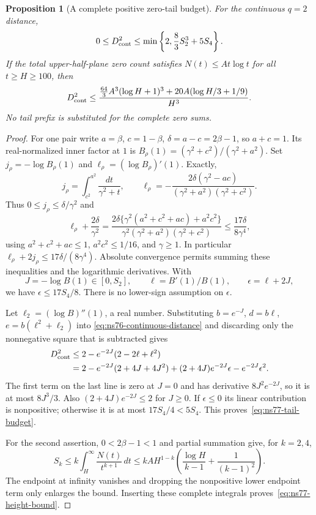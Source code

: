 \documentclass[11pt]{article}
\newtheorem{proposition}[theorem]{Proposition}
\theoremstyle{remark}
\begin{document}
\begin{proposition}[A complete positive zero-tail budget]
\label{prop:ns77-tail-budget}
For the continuous $q=2$ distance,
\begin{equation}
 0\leq D_{\rm cont}^2\leq
       \min\left\{2,\frac83S_2^3+5S_4\right\}.
 \label{eq:ns77-tail-budget}
\end{equation}
If the total upper-half-plane zero count satisfies
$N(t)\leq A t\log t$ for all $t\geq H\geq100$, then
\begin{equation}
 D_{\rm cont}^2\leq
 \frac{\frac{64}{3}A^3(\log H+1)^3
                  +20A(\log H/3+1/9)}{H^3}.
 \label{eq:ns77-height-bound}
\end{equation}
No tail prefix is substituted for the complete zero sums.
\end{proposition}
\begin{proof}
For one pair write $a=\beta$, $c=1-\beta$, $\delta=a-c=2\beta-1$,
so $a+c=1$. Its real-normalized inner factor at $1$ is
$B_\rho(1)=(\gamma^2+c^2)/(\gamma^2+a^2)$.
Set $j_\rho=-\log B_\rho(1)$ and
$\ell_\rho=(\log B_\rho)'(1)$. Exactly,
\[
 j_\rho=\int_{c^2}^{a^2}\frac{dt}{\gamma^2+t},\qquad
 \ell_\rho=-\frac{2\delta(\gamma^2-ac)}
                        {(\gamma^2+a^2)(\gamma^2+c^2)}.
\]
Thus $0\leq j_\rho\leq\delta/\gamma^2$ and
\[
 \ell_\rho+\frac{2\delta}{\gamma^2}
 =\frac{2\delta\{\gamma^2(a^2+c^2+ac)+a^2c^2\}}
        {\gamma^2(\gamma^2+a^2)(\gamma^2+c^2)}
 \leq\frac{17\delta}{8\gamma^4},
\]
using $a^2+c^2+ac\leq1$, $a^2c^2\leq1/16$, and $\gamma\geq1$.
In particular $\ell_\rho+2j_\rho\leq17\delta/(8\gamma^4)$.
Absolute convergence permits summing these inequalities and the
logarithmic derivatives. With
\[
 J=-\log B(1)\in[0,S_2],\qquad \ell=B'(1)/B(1),
 \qquad \epsilon=\ell+2J,
\]
we have $\epsilon\leq17S_4/8$. There is no lower-sign assumption on
$\epsilon$.

Let $\ell_2=(\log B)''(1)$, a real number. Substituting
$b=e^{-J}$, $d=b\ell$, $e=b(\ell^2+\ell_2)$ into
\eqref{eq:ns76-continuous-distance} and discarding only the
nonnegative square that is subtracted gives
\begin{align*}
 D_{\rm cont}^2
 &\leq 2-e^{-2J}(2-2\ell+\ell^2)\\
 &=2-e^{-2J}(2+4J+4J^2)
       +(2+4J)e^{-2J}\epsilon-e^{-2J}\epsilon^2.
\end{align*}
The first term on the last line is zero at $J=0$ and has derivative
$8J^2e^{-2J}$, so it is at most $8J^3/3$.
Also $(2+4J)e^{-2J}\leq2$ for $J\geq0$. If $\epsilon\leq0$ its
linear contribution is nonpositive; otherwise it is at most
$17S_4/4<5S_4$. This proves~\eqref{eq:ns77-tail-budget}.

For the second assertion, $0<2\beta-1<1$ and partial summation give,
for $k=2,4$,
\[
 S_k\leq k\int_H^\infty\frac{N(t)}{t^{k+1}}\,dt
 \leq kA H^{1-k}
             \left(\frac{\log H}{k-1}+\frac1{(k-1)^2}\right).
\]
The endpoint at infinity vanishes and dropping the nonpositive lower
endpoint term only enlarges the bound. Inserting these complete
integrals proves~\eqref{eq:ns77-height-bound}.
\end{proof}
\end{document}
